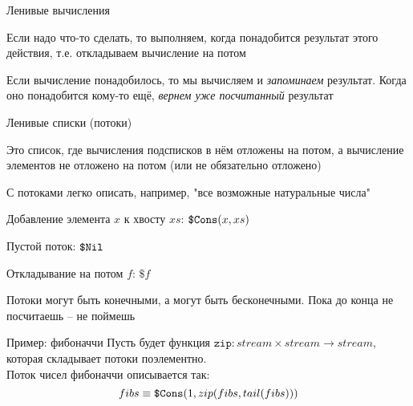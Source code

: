 \begin{frame}{Ленивые вычисления}

\begin{idea}
Если надо что-то сделать, то выполняем, когда понадобится результат этого действия, т.е. откладываем вычисление на потом
\end{idea}

\begin{idea}
Если вычисление понадобилось, то мы вычисляем и \emph{запоминаем} результат. Когда оно понадобится кому-то ещё, \emph{вернем уже посчитанный} результат
\end{idea}

\end{frame}

\begin{frame}{Ленивые списки (потоки)}
\begin{definition}
Это список, где вычисления подсписков в нём отложены на потом, а вычисление элементов не отложено на потом (или не обязательно отложено)
\end{definition}
С потоками легко описать, например, "все возможные натуральные числа"\vspace{1em}

\begin{notation}
Добавление элемента $x$ к хвосту $xs$: $\texttt{\$Cons}(x,xs)$

Пустой поток: $\texttt{\$Nil}$

Откладывание на потом $f$: $\texttt{\$}f$
\end{notation}
\begin{remark}
Потоки могут быть конечными, а могут быть бесконечными. Пока до конца не посчитаешь -- не поймешь
\end{remark}
\end{frame}

\begin{frame}{Пример: фибоначчи}
Пусть будет функция $\texttt{zip}: stream\times stream \rightarrow stream$, которая складывает потоки поэлементно.\\

Поток чисел фибоначчи описывается так:
\[
fibs \equiv \texttt{\$Cons}(1,zip(fibs, tail(fibs)))
\]
\begin{center}

\end{center}
\end{frame}
